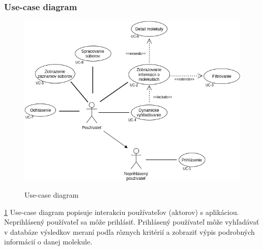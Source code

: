 \documentclass[12pt,a4paper]{article}
\begin{document}
\subsubsection{Use-case diagram}
\begin{figure}[H]
	\caption{Use-case diagram}
	\includegraphics[width=\textwidth]{use-case_diagram}
	\label{fig:use_case}
\end{figure}
\ref{fig:use_case}
Use-case diagram popisuje interakciu používateľov (aktorov) s aplikáciou. Neprihlásený používateľ sa môže prihlásiť. Prihlásený používateľ môže vyhľadávať v databáze výsledkov meraní podľa rôznych kritérií a zobraziť výpis podrobných informácií o danej molekule.

\pagebreak
\end{document}
